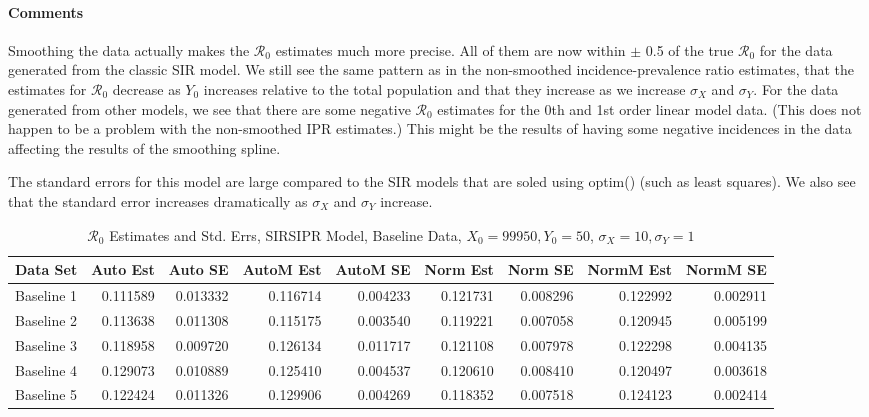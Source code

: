 \documentclass[12pt]{article}
\newcommand{\rr}{\ensuremath{\mathcal{R}_0}}
\begin{document}
\paragraph{Comments}

Smoothing the data actually makes the $\rr$ estimates much more precise. All of them are now within $\pm$ 0.5 of the true $\rr$ for the data generated from the classic SIR model. We still see the same pattern as in the non-smoothed incidence-prevalence ratio estimates, that the estimates for $\rr$ decrease as $Y_0$ increases relative to the total population and that they increase as we increase $\sigma_X$ and $\sigma_Y$. For the data generated from other models, we see that there are some negative $\rr$ estimates for the 0th and 1st order linear model data. (This does not happen to be a problem with the non-smoothed IPR estimates.) This might be the results of having some negative incidences in the data affecting the results of the smoothing spline. 

The standard errors for this model are large compared to the SIR models that are soled using optim() (such as least squares). We also see that the standard error increases dramatically as $\sigma_X$ and $\sigma_Y$ increase. 

\begin{table}[H]
	
	\caption{$\rr$ Estimates and Std. Errs, SIRSIPR Model,
		Baseline Data, $X_0 = 99950, Y_0 = 50$, 
		$\sigma_X = 10, \sigma_Y = 1$}
	\begin{footnotesize}
		\hskip -1cm
		\begin{tabular}{l|r|r|r|r|r|r|r|r}
			\hline
			Data Set & Auto Est & Auto SE & AutoM Est & AutoM SE & Norm Est & Norm SE & NormM Est & NormM SE\\
			\hline
			Baseline 1 & 0.111589 & 0.013332 & 0.116714 & 0.004233 & 0.121731 & 0.008296 & 0.122992 & 0.002911\\
			\hline
			Baseline 2 & 0.113638 & 0.011308 & 0.115175 & 0.003540 & 0.119221 & 0.007058 & 0.120945 & 0.005199\\
			\hline
			Baseline 3 & 0.118958 & 0.009720 & 0.126134 & 0.011717 & 0.121108 & 0.007978 & 0.122298 & 0.004135\\
			\hline
			Baseline 4 & 0.129073 & 0.010889 & 0.125410 & 0.004537 & 0.120610 & 0.008410 & 0.120497 & 0.003618\\
			\hline
			Baseline 5 & 0.122424 & 0.011326 & 0.129906 & 0.004269 & 0.118352 & 0.007518 & 0.124123 & 0.002414\\
			\hline
		\end{tabular}
	\end{footnotesize}
\end{table}
\end{document}
